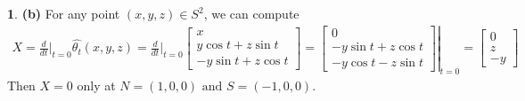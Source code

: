 \documentclass[10.5pt]{article}
\theoremstyle{definition}
\newtheorem{pb}{}
\newcommand{\tand}{\text{ and }}
\begin{document}
\begin{pb}
        \textbf{(b)} For any point \((x,y,z) \in S^2\), we can compute
        \begin{align*}
            X = \frac{d}{dt}\vert_{t=0} \hat{\theta_t}(x,y,z) = \frac{d}{dt}\vert_{t=0} \begin{bmatrix} x \\ y\cos t + z\sin t \\-y\sin t + z\cos t  \end{bmatrix}
            = \left.\begin{bmatrix}
                0 \\ -y \sin t + z\cos t \\ -y\cos t - z\sin t
            \end{bmatrix}\right\vert_{t=0} = \begin{bmatrix} 0 \\ z \\ -y \end{bmatrix}
        \end{align*}
        Then \(X = 0\) only at \(N = (1,0,0) \tand S = (-1,0,0)\).
    \end{pb}
\end{document}
